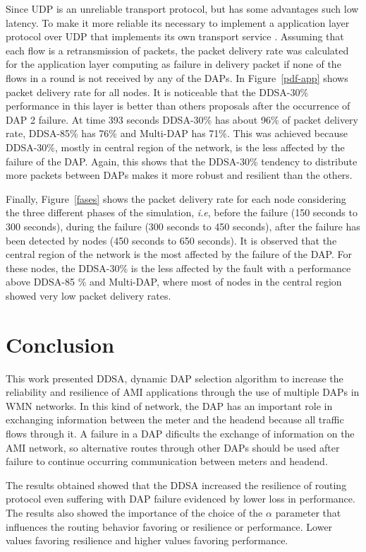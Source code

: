 \documentclass[conference]{IEEEtran}
\begin{document}
Since UDP is an unreliable transport protocol, but has some advantages such low latency. To make it more reliable its necessary to implement a application layer protocol over UDP that implements its own transport service \cite{RFC6272}. Assuming that each flow is a retransmission of packets, the packet delivery rate was calculated for the application layer computing as failure in delivery packet if none of the flows in a round is not received by any of the DAPs.
In Figure~\ref{pdf-app} shows packet delivery rate for all nodes.  It is noticeable that the DDSA-30\% performance in this layer is better than others proposals after the occurrence of DAP 2 failure. At time 393 seconds DDSA-30\% has about 96\% of packet delivery rate, DDSA-85\% has 76\% and Multi-DAP has 71\%. This was achieved because DDSA-30\%, mostly in central region of the network, is the less affected by the failure of the DAP. Again, this shows that the DDSA-30\% tendency to distribute more packets between DAPs makes it more robust and resilient than the others. 


Finally, Figure~\ref{fases} shows the packet delivery rate for each node considering the three different phases of the simulation, \textit{i.e}, before the failure (150 seconds to 300 seconds), during the failure (300 seconds to 450 seconds), after the failure has been detected by nodes (450 seconds to 650 seconds). It is observed that the central region of the network is the most affected by the failure of the DAP. For these nodes, the DDSA-30\% is the less affected by the fault with a performance above DDSA-85 \% and Multi-DAP, where most of nodes in the central region showed very low packet delivery rates.

   
   
\section{Conclusion}

This work presented DDSA, dynamic DAP selection algorithm to increase the reliability and resilience of AMI applications through the use of multiple DAPs in WMN networks. In this kind of network, the DAP has an important role in exchanging information between the meter and the headend because all traffic flows through it. A failure in a DAP dificults the exchange of information on the AMI network, so alternative routes through other DAPs should be used after failure to continue occurring communication between meters and headend.

The results obtained showed that the DDSA increased the resilience of routing protocol even suffering with DAP failure evidenced by lower loss in performance. The results also showed the importance of the choice of the $\alpha$ parameter that influences the routing behavior favoring or resilience or performance. Lower values favoring resilience and higher values favoring performance.
\end{document}
